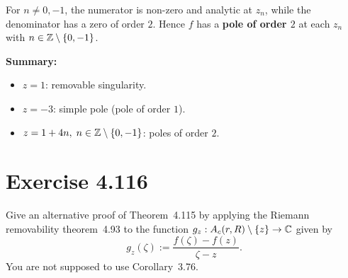 \documentclass{article}
\begin{document}
\begin{solution}
  For $n \ne 0, -1$, the numerator is non-zero and analytic at $z_n$, while
  the denominator has a zero of order $2$. Hence $f$ has a \textbf{pole of
  order $2$} at each $z_n$ with $n \in \mathbb{Z} \setminus \{0, -1\}$.

  \medskip
  \noindent\textbf{Summary:}
  \begin{itemize}
    \item $z = 1$: removable singularity.
    \item $z = -3$: simple pole (pole of order $1$).
    \item $z = 1 + 4n,\; n \in \mathbb{Z} \setminus \{0, -1\}$: poles of order $2$.
  \end{itemize}
\end{solution}

\section{Exercise 4.116}

Give an alternative proof of Theorem~4.115 by applying the Riemann removability
theorem~4.93 to the function $g_z : A_c(r, R) \setminus \{z\} \to \mathbb{C}$ given by
\[
  g_z(\zeta) := \frac{f(\zeta) - f(z)}{\zeta - z}.
\]
You are not supposed to use Corollary~3.76.
\end{document}
